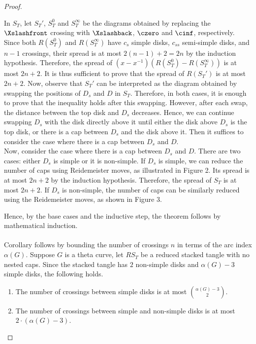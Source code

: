 \documentclass{article}
\theoremstyle{definition}
\theoremstyle{theorem}
\theoremstyle{proposition}
\theoremstyle{corollary}
\begin{document}
\begin{proof}
\begin{enumerate}
        In $S_T$, let $S_T'$, $S_T^0$ and $S_T^\infty$ be the diagrams obtained by replacing the $\Xslashfront$ crossing with $\Xslashback$, $\czero$ and $\cinf$, respectively. Since both $R \left( S_T^0 \right)$ and $R \left ( S_T^\infty \right)$ have $c_s$ simple disks, $c_{ss}$ semi-simple disks, and $n-1$ crossings, their spread is at most $2(n-1)+2=2n$ by the induction hypothesis. Therefore, the spread of $(x - x^{-1}) \left( R \left( S_T^0 \right) - R \left ( S_T^\infty \right) \right)$ is at most $2n+2$. It is thus sufficient to prove that the spread of $R \left ( S_T' \right)$ is at most $2n+2$. Now, observe that $S_T'$ can be interpreted as the diagram obtained by swapping the positions of $D_s$ and $D$ in $S_T$. Therefore, in both cases, it is enough to prove that the inequality holds after this swapping. However, after each swap, the distance between the top disk and $D_s$ decreases. Hence, we can continue swapping $D_s$ with the disk directly above it until either the disk above $D_s$ is the top disk, or there is a cap between $D_s$ and the disk above it. Then it suffices to consider the case where there is a cap between $D_s$ and $D$. \\
        Now, consider the case where there is a cap between $D_s$ and $D$. There are two cases: either $D_s$ is simple or it is non-simple. If $D_s$ is simple, we can reduce the number of caps using Reidemeister moves, as illustrated in Figure 2. Its spread is at most $2n+2$ by the induction hypothesis. Therefore, the spread of $S_T$ is at most $2n+2$. If $D_s$ is non-simple, the number of caps can be similarly reduced using the Reidemeister moves, as shown in Figure 3. \\
    \end{enumerate}
    Hence, by the base cases and the inductive step, the theorem follows by mathematical induction. \\ \\
    Corollary follows by bounding the number of crossings $n$ in terms of the arc index $\alpha(G)$. Suppose $G$ is a theta curve, let $RS_T$ be a reduced stacked tangle with no nested caps. Since the stacked tangle has $2$ non-simple disks and $\alpha(G)-3$ simple disks, the following holds.
    \begin{enumerate}
        \item The number of crossings between simple disks is at most $\binom{\alpha(G)-3}{2}$.
        \item The number of crossings between simple and non-simple disks is at most $2 \cdot (\alpha(G)-3)$.

\end{enumerate}
\end{proof}
\end{document}
